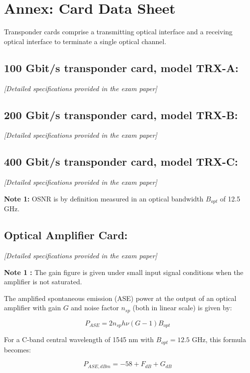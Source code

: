 \documentclass[a4paper,11pt]{article}
\begin{document}
\newpage

\section*{Annex: Card Data Sheet}

Transponder cards comprise a transmitting optical interface and a receiving optical interface to terminate a single optical channel.

\subsection*{100 Gbit/s transponder card, model TRX-A:}

\textit{[Detailed specifications provided in the exam paper]}

\subsection*{200 Gbit/s transponder card, model TRX-B:}

\textit{[Detailed specifications provided in the exam paper]}

\subsection*{400 Gbit/s transponder card, model TRX-C:}

\textit{[Detailed specifications provided in the exam paper]}

\textbf{Note 1:} OSNR is by definition measured in an optical bandwidth $B_{opt}$ of 12.5 GHz.

\subsection*{Optical Amplifier Card:}

\textit{[Detailed specifications provided in the exam paper]}

\textbf{Note 1 :} The gain figure is given under small input signal conditions when the amplifier is not saturated.

The amplified spontaneous emission (ASE) power at the output of an optical amplifier with gain $G$ and noise factor $n_{sp}$ (both in linear scale) is given by:

$$P_{ASE} = 2n_{sp}h\nu(G-1)B_{opt}$$

For a C-band central wavelength of 1545 nm with $B_{opt}=12.5$ GHz, this formula becomes:

$$P_{ASE,dBm} = -58 + F_{dB} + G_{dB}$$
\end{document}
